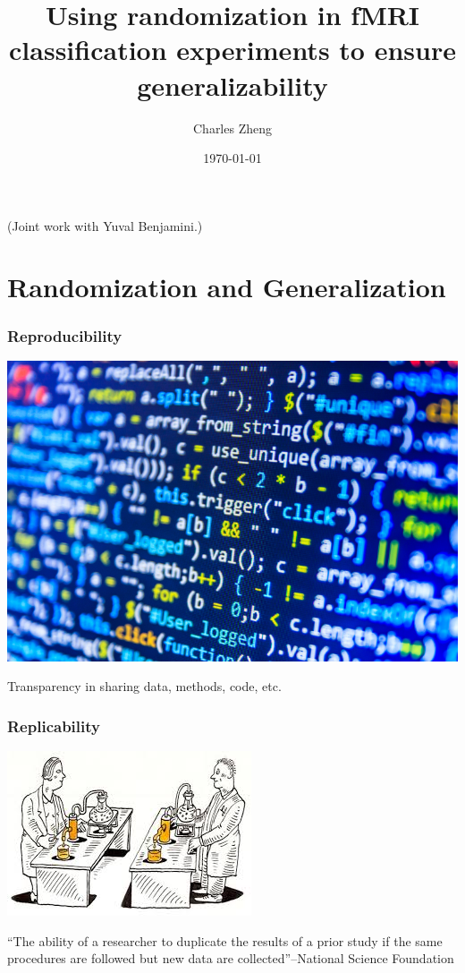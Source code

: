 \documentclass{beamer}
\title[tfMRI generalizability]{Using randomization in fMRI classification experiments to ensure generalizability}
\author{Charles Zheng} %
\institute[NIMH] %
{National Institute of Mental Health}
\date{\today} %
\begin{document}
\begin{frame}
\titlepage %
(Joint work with Yuval Benjamini.)
\end{frame}

\section{Randomization and Generalization}

\begin{frame}
\frametitle{Reproducibility}
\begin{center}
\includegraphics[scale = 0.8]{code_clipart.jpg}
\end{center}
Transparency in sharing data, methods, code, etc.
\end{frame}

\begin{frame}
\frametitle{Replicability}
\begin{center}
\includegraphics[scale = 0.7]{replicability.jpg} 
\end{center}
``The ability of a researcher to duplicate the results of a prior
study if the same procedures are followed but new data are
collected''--National Science Foundation
\end{frame}
\end{document}

